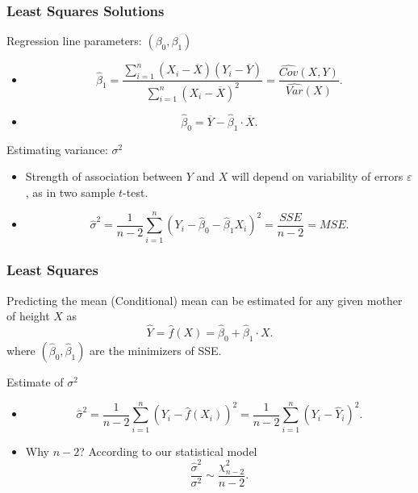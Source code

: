 \documentclass[handout]{beamer}
\begin{document}
   \begin{frame} \frametitle{Least Squares Solutions}

   \begin{block}
   {Regression line parameters: $(\beta_0, \beta_1)$}
   \begin{itemize}[<+->]
   \item $$
   \widehat{\beta}_1 = \frac{\sum_{i=1}^n(X_i - \overline{X})(Y_i - \overline{Y})}{\sum_{i=1}^n (X_i-\overline{X})^2} = \frac{\widehat{Cov}(X,Y)}{\widehat{Var}(X)}.$$

   \item $$\widehat{\beta}_0 = \overline{Y} - \widehat{\beta}_1 \cdot \overline{X}.$$

   \end{itemize}
   \end{block}
   \begin{block}
   {Estimating variance: $\sigma^2$}
   \begin{itemize}[<+->]
   \item  Strength of association between $Y$ and $X$ will depend on variability of errors $\varepsilon$,  as in two sample $t$-test.

   \item $$
   \widehat{\sigma}^2 = \frac{1}{n-2} \sum_{i=1}^n (Y_i - \widehat{\beta}_0 - \widehat{\beta}_1 X_i)^2 = \frac{SSE}{n-2} = MSE.$$
   \end{itemize}
   \end{block}
   \end{frame}


   \begin{frame} \frametitle{Least Squares}

   \begin{block}
   {Predicting the mean}
   (Conditional) mean can be estimated for any given mother of height $X$ as
   $$
   \widehat{Y} = \widehat{f}(X) = \widehat{\beta}_0 + \widehat{\beta}_1 \cdot X.$$
   where $(\widehat{\beta}_0, \widehat{\beta}_1)$ are the minimizers of SSE.
   \end{block}

   \begin{block}
   {Estimate of $\sigma^2$}
   \begin{itemize}


   \item
   $$
   \widehat{\sigma}^2 = \frac{1}{n-2} \sum_{i=1}^n \left(Y_i - \widehat{f}(X_i)\right)^2 = \frac{1}{n-2} \sum_{i=1}^n \left(Y_i - \widehat{Y}_i\right)^2.$$
   \item Why $n-2$? According to our statistical model
   $$
   \frac{\widehat{\sigma}^2}{\sigma^2} \sim \frac{\chi^2_{n-2}}{n-2}.$$
   \end{itemize}
   \end{block}
   \end{frame}
\end{document}
